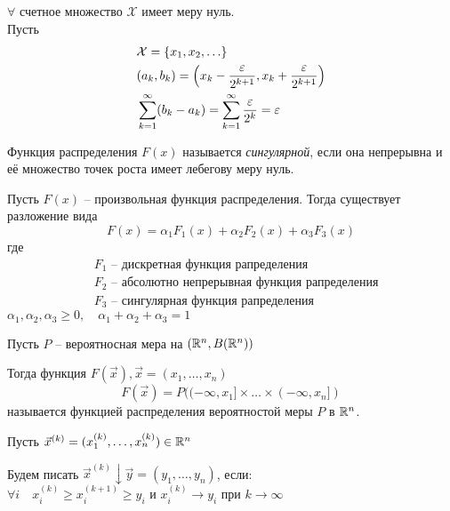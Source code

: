 \begin{example}
	$\forall$ счетное множество $\mathcal{X}$ имеет меру нуль.\\
	Пусть 
		\begin{align*}			
			&\mathcal{X} = \{ x_1, x_2, \ldots \}\\
			&(a_k, b_k) = \left( x_k - \frac{\varepsilon}{2^{k + 1}}, x_k + \frac{\varepsilon}{2^{k + 1}} \right)\\
			&\sum_{k = 1}^{\infty} (b_k - a_k) = \sum_{k = 1}^{\infty} \frac{\varepsilon}{2^k} = \varepsilon
		\end{align*}	
\end{example}

\begin{definition}
	Функция распределения $F(x)$ называется \emph{сингулярной}, 
	если она непрерывна и её множество точек роста имеет лебегову меру нуль.
\end{definition}

\begin{theorem}[Лебег]
	Пусть $F(x)$ -- произвольная функция распределения. Тогда существует разложение вида
	\begin{equation*}
		F(x) = \alpha_1 F_1(x) + \alpha_2 F_2(x) + \alpha_3 F_3(x)
	\end{equation*}	 
	где 
	\begin{align*}
		&F_1 \text{ -- дискретная функция рапределения}\\
		&F_2 \text{ -- абсолютно непрерывная функция рапределения}\\
		&F_3 \text{ -- сингулярная функция рапределения}
	\end{align*}
	$\alpha_1, \alpha_2, \alpha_3 \geq 0,\quad \alpha_1 + \alpha_2 + \alpha_3 = 1$
\end{theorem}


\begin{definition}
	Пусть $P$ -- вероятносная мера на $(\mathbb{R}^n , B(\mathbb{R}^n))$

	Тогда функция $F(\vec{x}), \vec{x} = (x_1, \ldots, x_n)$
	\begin{equation*}
		F(\vec{x}) = P((-\infty, x_1] \times \ldots \times (-\infty, x_n])
	\end{equation*}
	называется функцией распределения вероятностой меры $P$ в $\mathbb{R}^n$.
\end{definition}

\begin{designations}
	Пусть $\vec{x}^{(k)} = (x_1^{(k)}, \ldots, x_n^{(k)}) \in \mathbb{R}^n$

	Будем писать $\vec{x}^{(k)} \downarrow \vec{y} = (y_1, \ldots, y_n)$, если:\\
	$\forall i \quad x_i^{(k)} \geq x_i^{(k + 1)} \geq y_i$ и $x_i^{(k)} \to y_i$ при $k \to \infty$
\end{designations}

